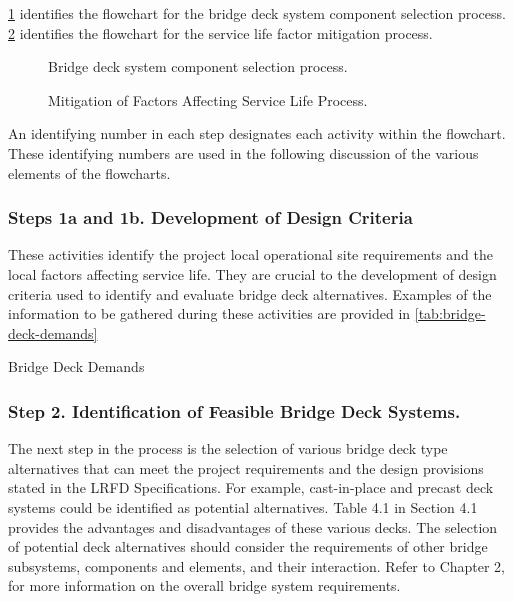 \cref{fig:deck-selection-process} identifies the flowchart for the bridge deck system component selection process. \cref{fig:mitigation-process}
identifies the flowchart for the service life factor mitigation process.

\begin{figure}
  \caption{Bridge deck system component selection process.}\label{fig:deck-selection-process}
\end{figure}

\begin{figure}
  \caption{Mitigation of Factors Affecting Service Life Process.}\label{fig:mitigation-process}
\end{figure}

An identifying number in each step designates each activity within the flowchart. These identifying numbers are used in the following discussion of the various elements of the flowcharts.

\subsubsection*{Steps 1a and 1b. Development of Design Criteria}
These activities identify the project local operational site requirements and the local factors affecting service life.
They are crucial to the development of design criteria used to identify and evaluate bridge deck alternatives.
Examples of the information to be gathered during these activities are provided in \cref{tab:bridge-deck-demands}

\begin{table}
  \caption{Bridge Deck Demands}\label{tab:bridge-deck-demands}
\end{table}

\subsubsection*{Step 2. Identification of Feasible Bridge Deck Systems.}
The next step in the process is the selection of various bridge deck type alternatives that can meet the project
requirements and the design provisions stated in the LRFD Specifications. For example, cast-in-place and precast
deck systems could be identified as potential alternatives. Table 4.1 in Section 4.1 provides the advantages and
disadvantages of these various decks. The selection of potential deck alternatives should consider the requirements of other bridge subsystems, components and elements, and their interaction. Refer to Chapter 2, for more information
on the overall bridge system requirements.

